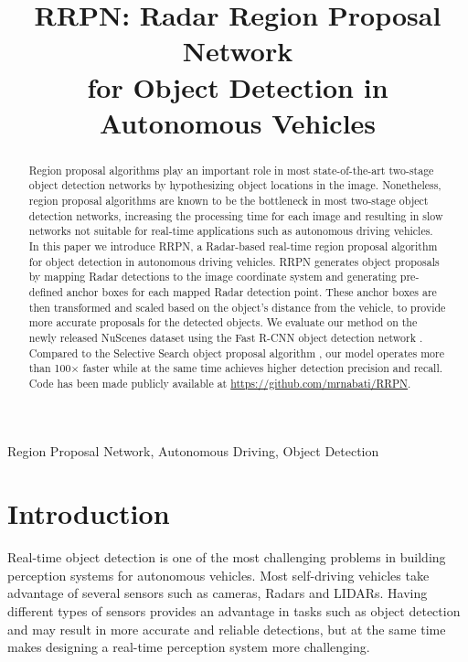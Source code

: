 \documentclass{article}
\title{RRPN: Radar Region Proposal Network \\for Object Detection in Autonomous Vehicles}
\newcommand{\dataset}{NuScenes }
\begin{document}
\maketitle
\begin{abstract}
Region proposal algorithms play an important role in most state-of-the-art 
two-stage object detection networks by hypothesizing object locations in 
the image. Nonetheless, region proposal algorithms are known to be the bottleneck 
in most two-stage object detection networks, increasing the processing time for each 
image and resulting in slow networks not suitable for real-time applications 
such as autonomous driving vehicles.
In this paper we introduce RRPN, a Radar-based real-time region proposal algorithm 
for object detection in autonomous driving vehicles. RRPN generates object 
proposals by mapping Radar detections to the image coordinate system and 
generating pre-defined anchor boxes for each mapped Radar detection point. These 
anchor boxes are then transformed and scaled based on the object's distance from 
the vehicle, to provide more accurate proposals for the detected objects.
We evaluate our method on the newly 
released \dataset dataset \cite{caesar2019nuscenes} using the Fast R-CNN object detection network 
\cite{Girshick2015}. Compared to the Selective Search object proposal 
algorithm \cite{ss2013}, our model operates more than 100$\times$ 
faster while at the same time achieves higher detection precision and recall.
Code has been made publicly available at \url{https://github.com/mrnabati/RRPN}.
\end{abstract}
\begin{keywords}
Region Proposal Network, Autonomous Driving, Object Detection
\end{keywords}

\section{Introduction}
\label{sec:intro}

Real-time object detection is one of the most challenging problems in building 
perception systems for autonomous vehicles. Most self-driving vehicles take 
advantage of several sensors such as cameras, Radars and LIDARs. Having different 
types of sensors provides an advantage in tasks such as object detection and may 
result in more accurate and reliable detections, but at the same time makes 
designing a real-time perception 
system more challenging.
\end{document}
